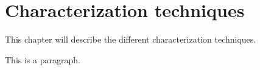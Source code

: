 
\chapter{Characterization techniques}
This chapter will describe the different characterization techniques. 

This is a paragraph.